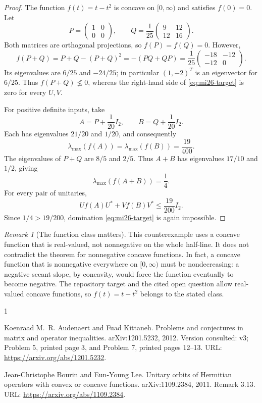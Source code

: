 \documentclass[10pt,a4paper]{article}
\theoremstyle{remark}
\newtheorem{remark}[theorem]{Remark}
\begin{document}
\begin{proof}
The function $f(t)=t-t^2$ is concave on $[0,\infty)$ and satisfies $f(0)=0$. Let
\[
 P=\begin{pmatrix}1&0\\0&0\end{pmatrix},\qquad
 Q=\frac1{25}\begin{pmatrix}9&12\\12&16\end{pmatrix}.
\]
Both matrices are orthogonal projections, so $f(P)=f(Q)=0$. However,
\[
 f(P+Q)=P+Q-(P+Q)^2=-(PQ+QP)
 =\frac1{25}\begin{pmatrix}-18&-12\\-12&0\end{pmatrix}.
\]
Its eigenvalues are $6/25$ and $-24/25$; in particular $(1,-2)^T$ is an eigenvector for $6/25$. Thus $f(P+Q)\not\leq0$, whereas the right-hand side of \eqref{eq:mi26-target} is zero for every $U,V$.

For positive definite inputs, take
\[
 A=P+\frac1{20}I_2,\qquad B=Q+\frac1{20}I_2.
\]
Each has eigenvalues $21/20$ and $1/20$, and consequently
\[
 \lambda_{\max}(f(A))=\lambda_{\max}(f(B))=\frac{19}{400}.
\]
The eigenvalues of $P+Q$ are $8/5$ and $2/5$. Thus $A+B$ has eigenvalues $17/10$ and $1/2$, giving
\[
 \lambda_{\max}(f(A+B))=\frac14.
\]
For every pair of unitaries,
\[
 Uf(A)U^*+Vf(B)V^*\leq\frac{19}{200}I_2.
\]
Since $1/4>19/200$, domination \eqref{eq:mi26-target} is again impossible.
\end{proof}

\begin{remark}[The function class matters]
This counterexample uses a concave function that is real-valued, not nonnegative on the whole half-line. It does not contradict the theorem for nonnegative concave functions. In fact, a concave function that is nonnegative everywhere on $[0,\infty)$ must be nondecreasing: a negative secant slope, by concavity, would force the function eventually to become negative. The repository target and the cited open question allow real-valued concave functions, so $f(t)=t-t^2$ belongs to the stated class.
\end{remark}

\begin{thebibliography}{1}

Koenraad M.~R. Audenaert and Fuad Kittaneh.
\newblock Problems and conjectures in matrix and operator inequalities.
\newblock arXiv:1201.5232, 2012.
\newblock Version consulted: v3; Problem 5, printed page 3, and Problem 7,
  printed pages 12--13.
\newblock URL: \url{https://arxiv.org/abs/1201.5232}.

Jean-Christophe Bourin and Eun-Young Lee.
\newblock Unitary orbits of {Hermitian} operators with convex or concave
  functions.
\newblock arXiv:1109.2384, 2011.
\newblock Remark 3.13.
\newblock URL: \url{https://arxiv.org/abs/1109.2384}.

\end{thebibliography}
\end{document}
